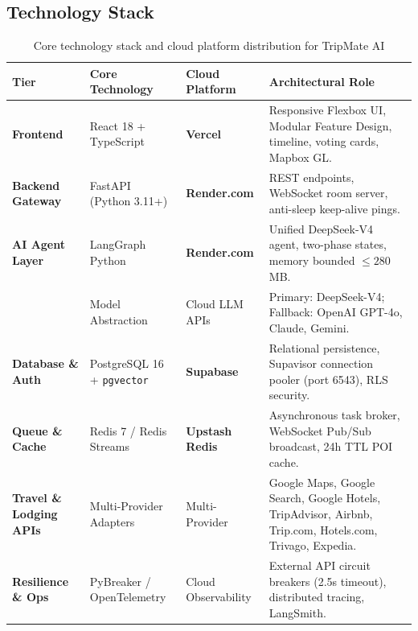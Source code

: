 \documentclass[11pt,a4paper]{article}
\begin{document}
\subsection{Technology Stack}
\begin{table}[H]
\centering
\footnotesize
\renewcommand{\arraystretch}{1.05}
\begin{tabularx}{\textwidth}{@{}l p{3.2cm} p{3.0cm} X@{}}
\toprule
\textbf{Tier} & \textbf{Core Technology} & \textbf{Cloud Platform} & \textbf{Architectural Role} \\
\midrule
\textbf{Frontend} & React 18 + TypeScript & \textbf{Vercel} & Responsive Flexbox UI, Modular Feature Design, timeline, voting cards, Mapbox GL. \\
\midrule
\textbf{Backend Gateway} & FastAPI (Python 3.11+) & \textbf{Render.com} & REST endpoints, WebSocket room server, anti-sleep keep-alive pings. \\
\midrule
\textbf{AI Agent Layer} & LangGraph Python & \textbf{Render.com} & Unified DeepSeek-V4 agent, two-phase states, memory bounded $\le 280$\,MB. \\
& Model Abstraction & Cloud LLM APIs & Primary: DeepSeek-V4; Fallback: OpenAI GPT-4o, Claude, Gemini. \\
\midrule
\textbf{Database \& Auth} & PostgreSQL 16 + \texttt{pgvector} & \textbf{Supabase} & Relational persistence, Supavisor connection pooler (port 6543), RLS security. \\
\midrule
\textbf{Queue \& Cache} & Redis 7 / Redis Streams & \textbf{Upstash Redis} & Asynchronous task broker, WebSocket Pub/Sub broadcast, 24h TTL POI cache. \\
\midrule
\textbf{Travel \& Lodging APIs} & Multi-Provider Adapters & Multi-Provider & Google Maps, Google Search, Google Hotels, TripAdvisor, Airbnb, Trip.com, Hotels.com, Trivago, Expedia. \\
\midrule
\textbf{Resilience \& Ops} & PyBreaker / OpenTelemetry & Cloud Observability & External API circuit breakers (2.5s timeout), distributed tracing, LangSmith. \\
\bottomrule
\end{tabularx}
\vspace{-0.2cm}
\caption{Core technology stack and cloud platform distribution for TripMate AI}
\label{tab:tech_stack}
\end{table}
\end{document}
